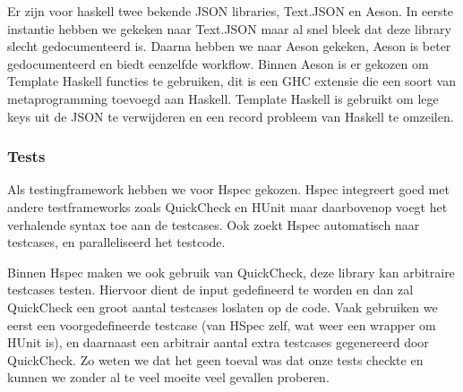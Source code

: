 Er zijn voor haskell twee bekende JSON libraries, Text.JSON en Aeson. In eerste instantie hebben we gekeken naar Text.JSON maar al snel bleek dat deze library slecht gedocumenteerd is. Daarna hebben we naar Aeson gekeken, Aeson is beter gedocumenteerd en biedt eenzelfde workflow.
Binnen Aeson is er gekozen om Template Haskell functies te gebruiken, dit is een GHC extensie die een soort van metaprogramming toevoegd aan Haskell. Template Haskell is gebruikt om lege keys uit de JSON te verwijderen en een record probleem van Haskell te omzeilen.

\subsubsection{Tests}
Als testingframework hebben we voor Hspec gekozen. Hspec integreert goed met andere testframeworks zoals QuickCheck en HUnit maar daarbovenop voegt het verhalende syntax toe aan de testcases. Ook zoekt Hspec automatisch naar testcases, en paralleliseerd het testcode.

Binnen Hspec maken we ook gebruik van QuickCheck, deze library kan arbitraire testcases testen. Hiervoor dient de input gedefineerd te worden en dan zal QuickCheck een groot aantal testcases loslaten op de code. Vaak gebruiken we eerst een voorgedefineerde testcase (van HSpec zelf, wat weer een wrapper om HUnit is), en daarnaast een arbitrair aantal extra testcases gegenereerd door QuickCheck. Zo weten we dat het geen toeval was dat onze tests checkte en kunnen we zonder al te veel moeite veel gevallen proberen.
